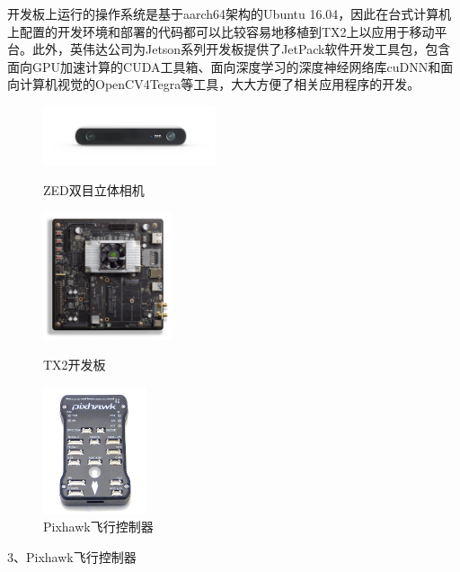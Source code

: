 开发板上运行的操作系统是基于aarch64架构的Ubuntu 16.04，因此在台式计算机上配置的开发环境和部署的代码都可以比较容易地移植到TX2上以应用于移动平台。此外，英伟达公司为Jetson系列开发板提供了JetPack软件开发工具包，包含面向GPU加速计算的CUDA工具箱、面向深度学习的深度神经网络库cuDNN和面向计算机视觉的OpenCV4Tegra等工具，大大方便了相关应用程序的开发。

\begin{figure}[htbp]
	\centering
	\begin{minipage}[c]{0.3\textwidth}
		\centering
		\includegraphics[width=2in]{figures/5_平台介绍/ZED}
		\caption{ZED双目立体相机}
	\end{minipage}
	\hfill
	\begin{minipage}[c]{0.3\textwidth}
		\centering
		\includegraphics[width=1.5in]{figures/5_平台介绍/TX2}
		\caption{TX2开发板}
	\end{minipage}
	\begin{minipage}[c]{0.3\textwidth}
		\centering
		\includegraphics[width=1.2in]{figures/5_平台介绍/pixhawk}
		\caption{Pixhawk飞行控制器}
	\end{minipage}
\end{figure}

3、Pixhawk飞行控制器

